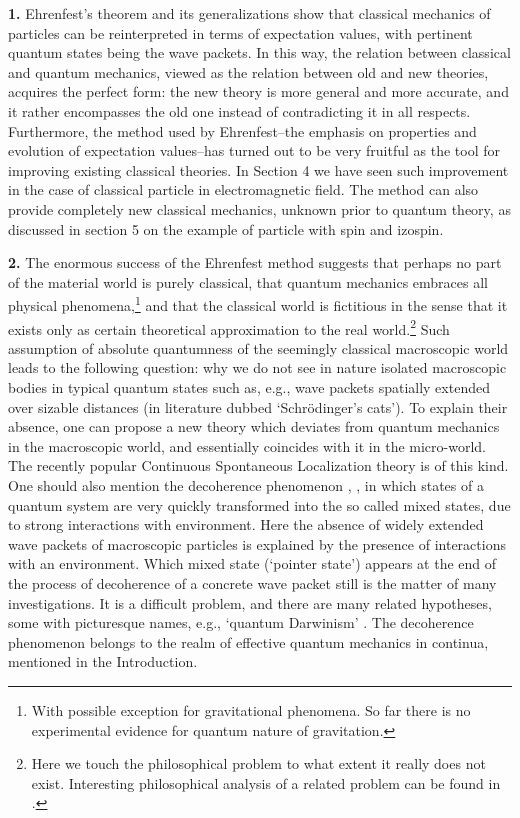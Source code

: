 \documentclass[12pt]{article}
\begin{document}
{\bf 1.} Ehrenfest's theorem and its generalizations show that classical mechanics of particles can be reinterpreted in terms of expectation values, with pertinent quantum states being the wave packets. In this way, the relation between classical and quantum mechanics, viewed as the relation between old and new theories, acquires the perfect form: the new theory is more general and more accurate, and it rather encompasses the old one instead of contradicting it in all respects. Furthermore, the method used by Ehrenfest--the emphasis on properties and evolution of expectation values--has turned out to be very fruitful as the tool for improving existing classical theories. In Section 4 we have seen such improvement in the case of classical particle in electromagnetic field. The method can also provide completely new classical mechanics, unknown prior to quantum theory, as discussed in section 5 on the example of particle with spin and izospin. 




{\bf 2.} The enormous success of the Ehrenfest method suggests that perhaps no part of the material world is purely classical, that quantum mechanics embraces all physical phenomena,\footnote{With possible exception for gravitational phenomena. So far there is no experimental evidence for quantum nature of gravitation.} and that the classical world is fictitious in the sense that it exists only as certain theoretical approximation to the real world.\footnote{Here we touch the philosophical problem to what extent it really does not exist. Interesting philosophical analysis of a related problem can be found in \cite{heller}.}
 Such assumption of absolute quantumness of the seemingly classical macroscopic world leads to the following question: why we do not see in nature isolated macroscopic bodies in typical quantum states such as, e.g., wave packets spatially extended over sizable distances (in literature dubbed `Schr\"odinger's cats'). To explain their absence, one can propose a new theory which deviates from quantum mechanics in the macroscopic world, and essentially coincides with it in the micro-world. The recently popular Continuous Spontaneous Localization theory \cite{CSL} is of this kind. 
 One should also mention 
the decoherence phenomenon \cite{zeh}, \cite{zurek}, in which states of a quantum system are very quickly transformed into the so called mixed states, due to strong interactions with environment. Here the absence of widely extended wave packets of macroscopic particles is explained by the presence of interactions with an environment. Which mixed state (`pointer state') appears at the end of the process of decoherence of a concrete wave packet still is the matter of many investigations. It is a difficult problem, and there are many related hypotheses, some with picturesque names, e.g., `quantum Darwinism' \cite{zurek2}. The decoherence phenomenon belongs to the realm of effective quantum mechanics in continua, mentioned in the Introduction. 
\end{document}

